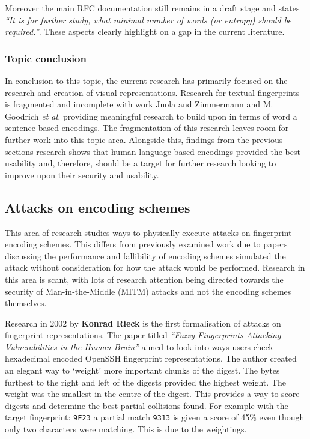 Moreover the main RFC documentation still remains in a draft stage and states \textit{``It is for further study, what minimal number of words (or entropy) should be required.''}. These aspects clearly highlight on a gap in the current literature.

\subsubsection*{Topic conclusion}

In conclusion to this topic, the current research has primarily focused on the research and creation of visual representations. Research for textual fingerprints is fragmented and incomplete with work Juola and Zimmermann 
\cite{juola1996whole} and M. Goodrich \textit{et al.}\cite{goodrich2006loud} providing meaningful research to build upon in terms of word a sentence based encodings. The fragmentation of this research leaves room for further work into this topic area. Alongside this, findings from the previous sections research shows that human language based encodings provided the best usability and, therefore, should be a target for further research looking to improve upon their security and usability.

\subsection{Attacks on encoding schemes}
This area of research studies ways to physically execute attacks on fingerprint encoding schemes. This differs from previously examined work due to papers discussing the performance and fallibility of encoding schemes simulated the attack without consideration for how the attack would be performed. Research in this area is scant, with lots of research attention being directed towards the security of Man-in-the-Middle (MITM) attacks and not the encoding schemes themselves.

Research in 2002 by \textbf{Konrad Rieck}\cite{rieck2002fuzzy} is the first formalisation of attacks on fingerprint representations. The paper titled \textit{``Fuzzy Fingerprints Attacking Vulnerabilities in the Human Brain''}
aimed to look into ways users check hexadecimal encoded OpenSSH fingerprint representations. The author created an elegant way to `weight' more important chunks of the digest. The bytes furthest to the right and left of the digests provided the highest weight. The weight was the smallest in the centre of the digest. This provides a way to score digests and determine the best partial collisions found. For example with the target fingerprint: \verb|9F23| a partial match \verb|9313| is given a score of 45\% even though only two characters were matching. This is due to the weightings.

